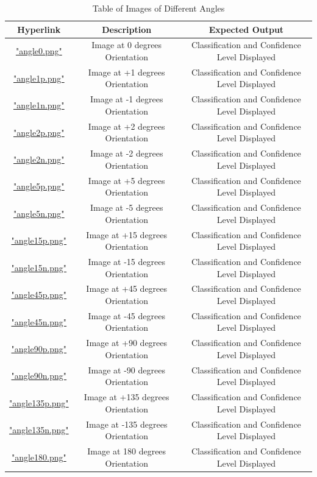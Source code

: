 \documentclass[12pt, titlepage]{article}
\begin{document}
\begin{table}[h!]
  \centering
  \begin{tabular}{|c|c|c|}
    \hline
    \textbf{Hyperlink} & \textbf{Description} & \textbf{Expected Output} \\ \hline
    \hyperref[0 degrees]{"angle0.png"} & Image at 0 degrees Orientation & Classification and Confidence Level Displayed\\ \hline
    \hyperref[+1 degrees]{"angle1p.png"} & Image at +1 degrees Orientation & Classification and Confidence Level Displayed\\ \hline
    \hyperref[-1 degrees]{"angle1n.png"} & Image at -1 degrees Orientation & Classification and Confidence Level Displayed\\ \hline
    \hyperref[+2 degrees]{"angle2p.png"} & Image at +2 degrees Orientation & Classification and Confidence Level Displayed\\ \hline
    \hyperref[-2 degrees]{"angle2n.png"} & Image at -2 degrees Orientation & Classification and Confidence Level Displayed\\ \hline
    \hyperref[+5 degrees]{"angle5p.png"} & Image at +5 degrees Orientation & Classification and Confidence Level Displayed\\ \hline
    \hyperref[-5 degrees]{"angle5n.png"} & Image at -5 degrees Orientation & Classification and Confidence Level Displayed\\ \hline
    \hyperref[+15 degrees]{"angle15p.png"} & Image at +15 degrees Orientation & Classification and Confidence Level Displayed\\ \hline
    \hyperref[-15 degrees]{"angle15n.png"} & Image at -15 degrees Orientation & Classification and Confidence Level Displayed\\ \hline
    \hyperref[+45 degrees]{"angle45p.png"} & Image at +45 degrees Orientation & Classification and Confidence Level Displayed\\ \hline
    \hyperref[-45 degrees]{"angle45n.png"} & Image at -45 degrees Orientation & Classification and Confidence Level Displayed\\ \hline
    \hyperref[+90 degrees]{"angle90p.png"} & Image at +90 degrees Orientation & Classification and Confidence Level Displayed\\ \hline
    \hyperref[-90 degrees]{"angle90n.png"} & Image at -90 degrees Orientation & Classification and Confidence Level Displayed\\ \hline
    \hyperref[+135 degrees]{"angle135p.png"} & Image at +135 degrees Orientation & Classification and Confidence Level Displayed\\ \hline
    \hyperref[-135 degrees]{"angle135n.png"} & Image at -135 degrees Orientation & Classification and Confidence Level Displayed\\ \hline
    \hyperref[180 degrees]{"angle180.png"} & Image at 180 degrees Orientation & Classification and Confidence Level Displayed\\ \hline
  \end{tabular}
  \caption{Table of Images of Different Angles}
  \label{table_angle}
\end{table}
\end{document}

